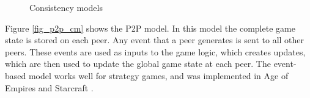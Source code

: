 \documentclass[10pt,a4paper,journal,cspaper,compsoc]{IEEEtran}
\begin{document}
\begin{figure}[htbp]
\caption{Consistency models}
\end{figure}
%
Figure \ref{fig_p2p_cm} shows the P2P model. In this model the complete game state is stored on each peer. Any event that a peer generates is sent to
all other peers. These events are used as inputs to the game logic, which creates updates, which are then used to update the global game state at
each peer. The event-based model works well for strategy games, and was implemented in Age of Empires \cite{p2p_cm_aoe} and Starcraft
\cite{starcraft_network_model}.
\end{document}
